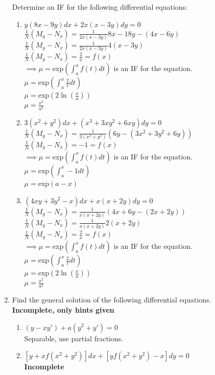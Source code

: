\documentclass[a4paper]{article}
\begin{document}
\begin{enumerate}
{{\\
\\Determine an IF for the following differential equations:
\begin{enumerate}
\item{$y(8x-9y)dx+2x(x-3y)dy=0$
\\$\frac{1}{N}(M_y-N_x)=\frac{1}{2x(x-3y)} 8x-18y-(4x-6y)$
\\$\frac{1}{N}(M_y-N_x)=\frac{1}{2x(x-3y)} 4(x-3y)$
\\$\frac{1}{N}(M_y-N_x)=\frac{2}{x}=f(x)$
\\$\implies \mu=$exp$(\int_a ^x f(t) dt)$ is an IF for the equation.
\\$\mu=$exp$(\int_a ^x \frac{2}{t}dt)$
\\$\mu=$exp$(2\ln(\frac{x}{a}))$
\\$\mu=\frac{x^2}{a^2}$
}
\item{$3(x^2+y^2)dx+(x^3+3xy^2+6xy)dy=0$
\\$\frac{1}{N}(M_y-N_x)=\frac{1}{3(x^2+y^2)} (6y-(3x^2+3y^2+6y))$
\\$\frac{1}{N}(M_y-N_x)=-1=f(x)$
\\$\implies \mu=$exp$(\int_a ^x f(t) dt)$ is an IF for the equation.
\\$\mu=$exp$(\int_a ^x -1 dt)$
\\$\mu=$exp$(a-x)$
}
\item{$(4xy+3y^2-x)dx+x(x+2y)dy=0$
\\$\frac{1}{N}(M_y-N_x)=\frac{1}{x(x+2y)} (4x+6y-(2x+2y))$
\\$\frac{1}{N}(M_y-N_x)=\frac{1}{x(x+2y)} 2(x+2y)$
\\$\frac{1}{N}(M_y-N_x)=\frac{2}{x}=f(x)$
\\$\implies \mu=$exp$(\int_a ^x f(t) dt)$ is an IF for the equation.
\\$\mu=$exp$(\int_a ^x \frac{2}{t} dt)$
\\$\mu=$exp$(2\ln(\frac{x}{a}))$
\\$\mu=\frac{x^2}{a^2}$
}
\end{enumerate}
}
}
\item{Find the general solution of the following differential equations.
\\\textbf{Incomplete, only hints given}
\begin{enumerate}
\item{$(y-xy')+a(y^2+y')=0$
\\Separable, use partial fractions.
}
\item{$[y+xf(x^2+y^2)]dx+[yf(x^2+y^2)-x]dy=0$
\\\textbf{Incomplete}
}
\end{enumerate}}
\end{enumerate}
\end{document}
